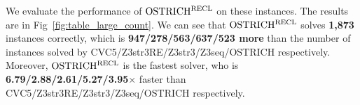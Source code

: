 
We evaluate the performance of $\rm OSTRICH^{RECL}$ on these instances. The results are in Fig~\ref{fig:table_large_count}. We can see that $\rm OSTRICH^{RECL}$ solves \textbf{1,873} instances correctly, which is \textbf{947/278/563/637/523 more} than the number of instances solved by CVC5/Z3str3RE/Z3str3/Z3seq/OSTRICH respectively. Moreover, \newline
$\rm OSTRICH^{RECL}$ is the fastest solver, who is \textbf{ 6.79/2.88/2.61/5.27/3.95$\times$ } faster than CVC5/Z3str3RE/Z3str3/Z3seq/OSTRICH respectively.
\vspace{-2mm}





